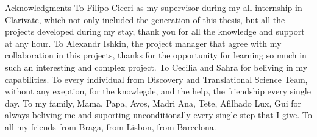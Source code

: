 
%

\begin{ntacknowledgements}

Acknowledgments
To Filipo Ciceri as my supervisor during my all internship in Clarivate, which not only included the generation of this thesis, but all the projects developed during my stay, thank you for all the knowledge and support at any hour. To Alexandr Ishkin, the project manager that agree with my collaboration in this projects, thanks for the opportunity for learning so much in such an interesting and complex project.
To Cecilia and Sahra for beliving in my capabilities.
To every individual from Discovery and Translational Science Team, without any exeption, for the knowlegde, and the help, the friendship every single day.
To my family, Mama, Papa, Avos, Madri Ana, Tete, Afilhado Lux, Gui for always beliving me and suporting unconditionally every single step that I give.
To all my friends from Braga, from Lisbon, from Barcelona.

\end{ntacknowledgements}